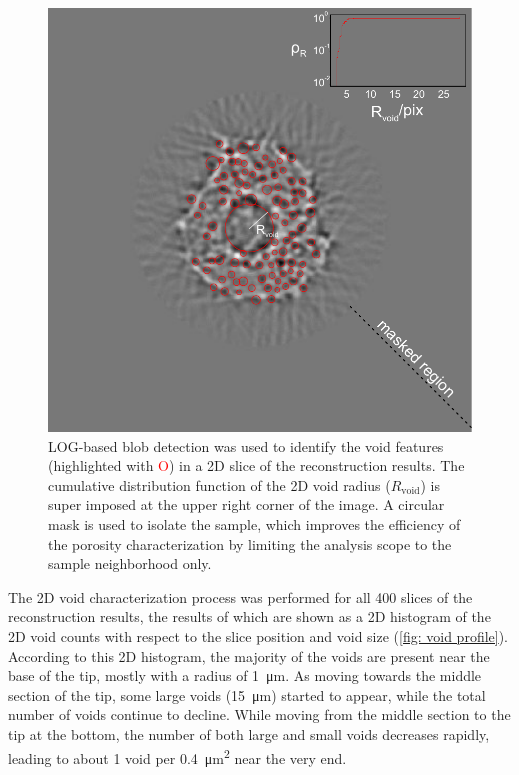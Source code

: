 \documentclass[12pt]{scrartcl}
\newcommand{\myscale}{1}
\begin{document}
\renewcommand{\myscale}{.5}
\begin{figure}
\centering
\includegraphics[scale=\myscale]{voidDetectionDemo_mid}
\caption{
LOG-based blob detection was used to identify the void features (highlighted with \textcolor{red}{O}) in a 2D slice of the reconstruction results.
The cumulative distribution function of the 2D void radius ($R_\text{void}$) is super imposed at the upper right corner of the image.
A circular mask is used to isolate the sample, which improves the efficiency of the porosity characterization by limiting the analysis scope to the sample neighborhood only.
}\label{fig: void detection demo}
\end{figure}

The 2D void characterization process was performed for all 400 slices of the reconstruction results, the results of which are shown as a 2D histogram of the 2D void counts with respect to the slice position and void size (\cref{fig: void profile}).
According to this 2D histogram, the majority of the voids are present near the base of the tip, mostly with a radius of \SI{1}{\micro\meter}.
As moving towards the middle section of the tip, some large voids (\SI{15}{\micro\meter}) started to appear, while the total number of voids continue to decline.
While moving from the middle section to the tip at the bottom, the number of both large and small voids decreases rapidly, leading to about 1 void per \SI{0.4}{\square\micro\meter} near the very end.
 
\end{document}
